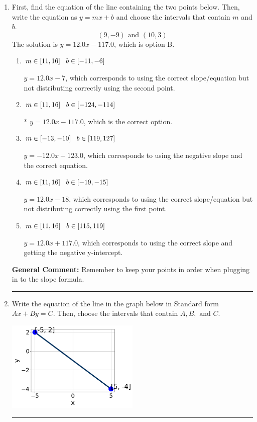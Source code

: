 \documentclass{extbook}[14pt]
\newcommand{\litem}[1]{\item #1

\rule{\textwidth}{0.4pt}}
\begin{document}
\begin{enumerate}\litem{
First, find the equation of the line containing the two points below. Then, write the equation as $ y=mx+b $ and choose the intervals that contain $m$ and $b$.
\[ (9, -9) \text{ and } (10, 3) \]
The solution is \( y = 12.0x -117.0 \), which is option B.\begin{enumerate}[label=\Alph*.]
\item \( m \in [11, 16] \hspace*{3mm} b \in [-11, -6] \)

 $y = 12.0x -7$, which corresponds to using the correct slope/equation but not distributing correctly using the second point.
\item \( m \in [11, 16] \hspace*{3mm} b \in [-124, -114] \)

* $y = 12.0x -117.0$, which is the correct option.
\item \( m \in [-13, -10] \hspace*{3mm} b \in [119, 127] \)

 $y = -12.0x + 123.0$, which corresponds to using the negative slope and the correct equation.
\item \( m \in [11, 16] \hspace*{3mm} b \in [-19, -15] \)

 $y = 12.0x -18$, which corresponds to using the correct slope/equation but not distributing correctly using the first point.
\item \( m \in [11, 16] \hspace*{3mm} b \in [115, 119] \)

 $y = 12.0x + 117.0$, which corresponds to using the correct slope and getting the negative y-intercept.
\end{enumerate}

\textbf{General Comment:} Remember to keep your points in order when plugging in to the slope formula.
}
\litem{
Write the equation of the line in the graph below in Standard form $Ax+By=C$. Then, choose the intervals that contain $A, B, \text{ and } C$.

\begin{center}
    \includegraphics[width=0.5\textwidth]{../Figures/linearGraphToStandardCopyB.png}
\end{center}



}
\end{enumerate}
\end{document}
